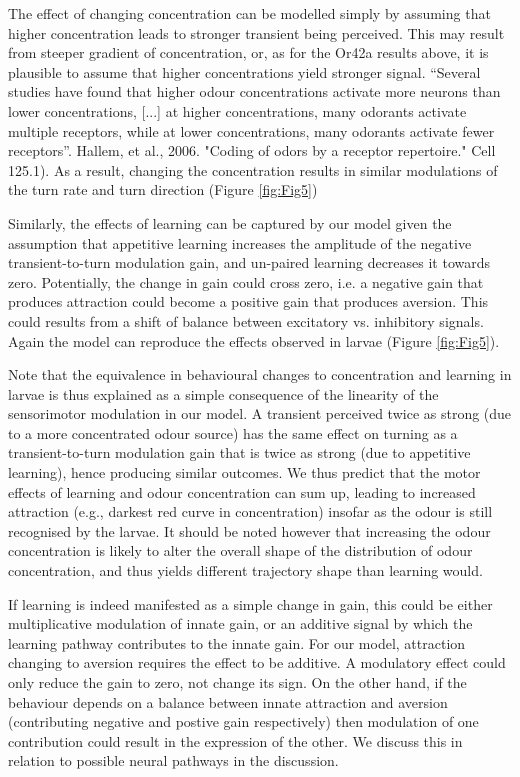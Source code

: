 \documentclass[10pt,a4paper]{article}
\begin{document}
The effect of changing concentration can be modelled simply by assuming that higher concentration leads to stronger transient being perceived. This may result from steeper gradient of concentration, or, as for the Or42a results above, it is plausible to assume that higher concentrations yield stronger signal.  “Several studies have found that higher odour concentrations activate more neurons than lower concentrations, [...] at higher concentrations, many odorants activate multiple receptors, while at lower concentrations, many odorants activate fewer receptors”. Hallem, et al., 2006. "Coding of odors by a receptor repertoire." Cell 125.1). As a result, changing the concentration results in similar modulations of the turn rate and turn direction (Figure \ref{fig:Fig5})

Similarly, the effects of learning can be captured by our model given the assumption that appetitive learning increases the amplitude of the negative transient-to-turn modulation gain, and un-paired learning decreases it towards zero. Potentially, the change in gain could cross zero, i.e. a negative gain that produces attraction could become a positive gain that produces aversion. This could results from a shift of balance between excitatory vs. inhibitory signals. Again the model can reproduce the effects observed in larvae (Figure \ref{fig:Fig5}). 

Note that the equivalence in behavioural changes to concentration and learning in larvae is thus explained as a simple consequence of the linearity of the sensorimotor modulation in our model. A transient perceived twice as strong (due to a more concentrated odour source) has the same effect on turning as a transient-to-turn modulation gain that is twice as strong (due to appetitive learning), hence producing similar outcomes. We thus predict that the motor effects of learning and odour concentration can sum up, leading to increased attraction (e.g., darkest red curve in concentration) insofar as the odour is still recognised by the larvae. It should be noted however that increasing the odour concentration is likely to alter the overall shape of the distribution of odour concentration, and thus yields different trajectory shape than learning would.

If learning is indeed manifested as a simple change in gain, this could be either multiplicative modulation of innate gain, or an additive signal by which the learning pathway contributes to the innate gain. For our model, attraction changing to aversion requires the effect to be additive. A modulatory effect could only reduce the gain to zero, not change its sign. On the other hand, if the behaviour depends on a balance between innate attraction and aversion (contributing negative and postive gain respectively) then modulation of one contribution could result in the expression of the other. We discuss this in relation to possible neural pathways in the discussion.
\end{document}
